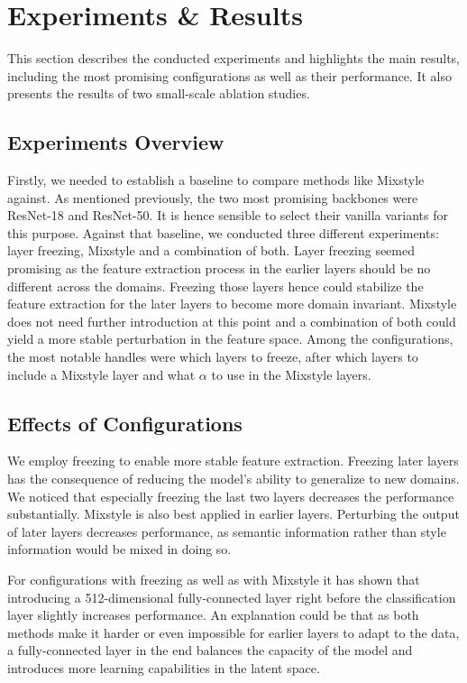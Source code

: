 \section{Experiments \& Results}

This section describes the conducted experiments and highlights the main results, including the most promising configurations as well as their performance. It also presents the results of two small-scale ablation studies.

\subsection{Experiments Overview}

Firstly, we needed to establish a baseline to compare methods like Mixstyle against. As mentioned previously, the two most promising backbones were ResNet-18 and ResNet-50. It is hence sensible to select their vanilla variants for this purpose. Against that baseline, we conducted three different experiments: layer freezing, Mixstyle and a combination of both. Layer freezing seemed promising as the feature extraction process in the earlier layers should be no different across the domains. Freezing those layers hence could stabilize the feature extraction for the later layers to become more domain invariant. Mixstyle does not need further introduction at this point and a combination of both could yield a more stable perturbation in the feature space. Among the configurations, the most notable handles were which layers to freeze, after which layers to include a Mixstyle layer and what $\alpha$ to use in the Mixstyle layers.

\subsection{Effects of Configurations}

We employ freezing to enable more stable feature extraction. Freezing later layers has the consequence of reducing the model's ability to generalize to new domains. We noticed that especially freezing the last two layers decreases the performance substantially. Mixstyle is also best applied in earlier layers. Perturbing the output of later layers decreases performance, as semantic information rather than style information would be mixed in doing so.

For configurations with freezing as well as with Mixstyle it has shown that introducing a 512-dimensional fully-connected layer right before the classification layer slightly increases performance. An explanation could be that as both methods make it harder or even impossible for earlier layers to adapt to the data, a fully-connected layer in the end balances the capacity of the model and introduces more learning capabilities in the latent space.


